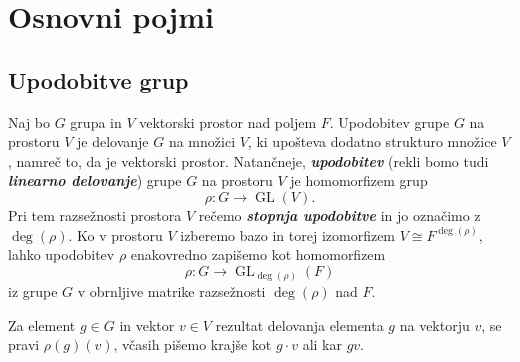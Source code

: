 \documentclass[11pt]{book}
\DeclareMathOperator\GL{GL}
\def\definicija{\color{rdeca}\bf\em}
\theoremstyle{definition}
\theoremstyle{zgled}
\theoremstyle{odprtproblem}
\theoremstyle{domacanaloga}
\theoremstyle{izrek}
\begin{document}
\section{Osnovni pojmi}

\subsection{Upodobitve grup}

Naj bo $G$ grupa in $V$ vektorski prostor nad poljem $F$. Upodobitev grupe $G$ na prostoru $V$ je delovanje $G$ na množici $V$, ki upošteva dodatno strukturo množice $V$, namreč to, da je vektorski prostor. Natančneje, {\definicija upodobitev} (rekli bomo tudi {\definicija linearno delovanje}) grupe $G$ na prostoru $V$ je homomorfizem grup
\[
    \rho \colon G \to \GL(V).
\]
Pri tem razsežnosti prostora $V$ rečemo {\definicija stopnja upodobitve} in jo označimo z $\deg(\rho)$. Ko v prostoru $V$ izberemo bazo in torej izomorfizem $V \cong F^{\deg(\rho)}$, lahko upodobitev $\rho$ enakovredno zapišemo kot homomorfizem
\[
    \rho \colon G \to \textstyle \GL_{\deg(\rho)}(F)
\]
iz grupe $G$ v obrnljive matrike razsežnosti $\deg(\rho)$ nad $F$.

Za element $g \in G$ in vektor $v \in V$ rezultat delovanja elementa $g$ na vektorju $v$, se pravi $\rho(g)(v)$, včasih pišemo krajše kot $g \cdot v$ ali kar $gv$.
\end{document}
